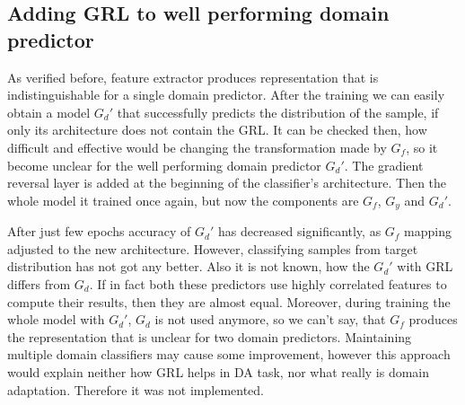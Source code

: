 \documentclass{article}
\begin{document}
\subsection{Adding GRL to well performing domain predictor}
As verified before, feature extractor produces representation that is indistinguishable for a single domain predictor. After the training we can easily obtain a model $G_{d}'$ that successfully predicts the distribution of the sample, if only its architecture does not contain the GRL. It can be checked then, how difficult and effective would be changing the transformation made by $G_{f}$, so it become unclear for the well performing domain predictor $G_{d}'$. The gradient reversal layer is added at the beginning of the classifier's architecture. Then the whole model it trained once again, but now the components are $G_{f}$, $G_{y}$ and $G_{d}'$. 
\par
After just few epochs accuracy of $G_{d}'$ has decreased significantly, as $G_{f}$ mapping adjusted to the new architecture. However, classifying samples from target distribution has not got any better. Also it is not known, how the $G_{d}'$ with GRL differs from $G_{d}$. If in fact both these predictors use highly correlated features to compute their results, then they are almost equal. Moreover, during training the whole model with $G_{d}'$, $G_{d}$ is not used anymore, so we can't say, that $G_{f}$ produces the representation that is unclear for two domain predictors. Maintaining multiple domain classifiers may cause some improvement, however this approach would explain neither how GRL helps in DA task, nor what really is domain adaptation. Therefore it was not implemented.
\end{document}
